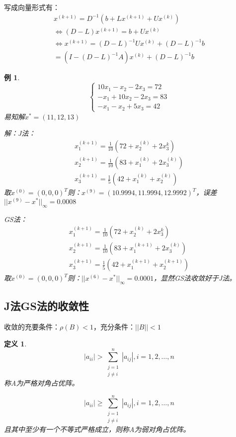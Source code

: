 \documentclass[a4paper]{article}
\newtheorem{definition}{定义}[section]
\newtheorem{example}{例}[section]
\begin{document}
写成向量形式有：
\begin{equation}
  \begin{array}{lr}
    x^{(k+1)} = D^{-1}(b+Lx^{(k+1)}+Ux^{(k)}) \\
    \Leftrightarrow (D-L)x^{(k+1)} = b + Ux^{(k)} \\
    \Leftrightarrow x^{(k+1)} = (D-L)^{-1}Ux^{(k)} + (D-L)^{-1}b \\
    = (I-(D-L)^{-1}A)x^{(k)} + (D-L)^{-1}b
  \end{array}
\end{equation}

\begin{example}
  $$\left\{
    \begin{array}{lr}
      10x_1-x_2-2x_3=72 \\
      -x_1+10x_2-2x_3=83 \\
      -x_1-x_2+5x_3=42
    \end{array}
    \right.$$
    易知解$x^*=(11,12,13)$

    解：J法：
    $$\begin{array}{lr}
      x_1^{(k+1)} = \frac{1}{10}(72 + x_2^{(k)}+2x_3^{k}) \\
      x_2^{(k+1)} = \frac{1}{10}(83 + x_1^{(k)}+2x_3^{(k)}) \\
      x_3^{(k+1)} = \frac{1}{5}(42+x_1^{(k)}+x_2^{(k)})
    \end{array}$$
    取$x^{(0)}=(0,0,0)^T $则：$x^{(9)}=(10.9994, 11.9994, 12.9992)^T $，误差$||x^{(9)}-x^*||_\infty = 0.0008 $

    GS法：
    $$\begin{array}{lr}
      x_1^{(k+1)} = \frac{1}{10}(72 + x_2^{(k)}+2x_3^{k}) \\
      x_2^{(k+1)} = \frac{1}{10}(83 + x_1^{(k+1)}+2x_3^{(k)}) \\
      x_3^{(k+1)} = \frac{1}{5}(42+x_1^{(k+1)}+x_2^{(k+1)})
    \end{array}$$
    取$x^{(0)}=(0,0,0)^T $则：$||x^{(6)}-x^*||_\infty = 0.0001 $，显然GS法收敛好于J法。

\end{example}

\subsection{J法GS法的收敛性}
收敛的充要条件：$\rho(B)<1$，充分条件：$||B||<1$

\begin{definition}
  $$|a_{ii}| >\sum^n_{\substack{j=1\\j\neq i}}|a_{ij}|, i=1,2,\dots,n $$称A为严格对角占优阵。

  $$|a_{ii}| \ge \sum^n_{\substack{j=1\\j\neq i}}|a_{ij}|, i=1,2,\dots,n $$且其中至少有一个不等式严格成立，则称A为弱对角占优阵。
\end{definition}
\end{document}
